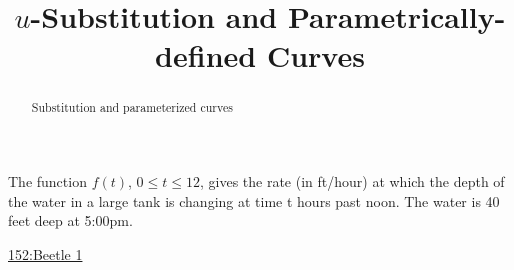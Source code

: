 \documentclass{ximera}
\title{$u$-Substitution and Parametrically-defined Curves}
\begin{document}
\begin{abstract}
Substitution and parameterized curves
\end{abstract}
\maketitle


\begin{question}\label{Q7yyweff}
The function $f(t)$, $0 \leq t \leq 12$, gives the rate (in ft/hour) at which the
depth of the water in a large tank is changing at time t hours past noon.
The water is 40 feet deep at 5:00pm.


\begin{onlineOnly}
    \begin{center}
\end{center}
\end{onlineOnly}

\href{https://www.desmos.com/calculator/gnwlraiqhd}{152:Beetle 1}

\end{question}
\end{document}
